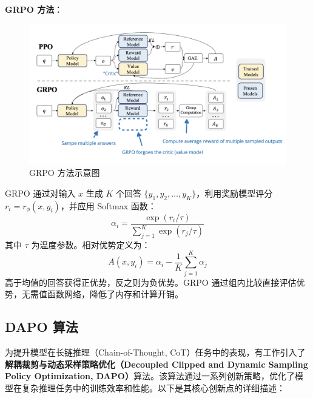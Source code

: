 \documentclass{pkuthesis}
\begin{document}
\textbf{GRPO 方法}：  
\begin{figure}[h]
    \centering
    \includegraphics[width=1\textwidth]{figures/grpo.png}
    \caption{GRPO 方法示意图\cite{shao2024deepseekmath}}
    \label{fig:grpo}
\end{figure}
GRPO 通过对输入 \( x \) 生成 \( K \) 个回答 \( \{y_1, y_2, \dots, y_K\} \)，利用奖励模型评分 \( r_i = r_{\phi}(x, y_i) \)，并应用 Softmax 函数：
\[
\alpha_i = \frac{\exp(r_i / \tau)}{\sum_{j=1}^K \exp(r_j / \tau)}
\]
其中 \( \tau \) 为温度参数。相对优势定义为：
\[
A(x, y_i) = \alpha_i - \frac{1}{K} \sum_{j=1}^K \alpha_j
\]
高于均值的回答获得正优势，反之则为负优势。GRPO 通过组内比较直接评估优势，无需值函数网络，降低了内存和计算开销。


\subsection{DAPO 算法}
为提升模型在长链推理（Chain-of-Thought, CoT）任务中的表现，有工作引入了\textbf{解耦裁剪与动态采样策略优化（Decoupled Clipped and Dynamic Sampling Policy Optimization, DAPO）}算法\cite{yu2025dapo}。该算法通过一系列创新策略，优化了模型在复杂推理任务中的训练效率和性能。以下是其核心创新点的详细描述：
\end{document}

